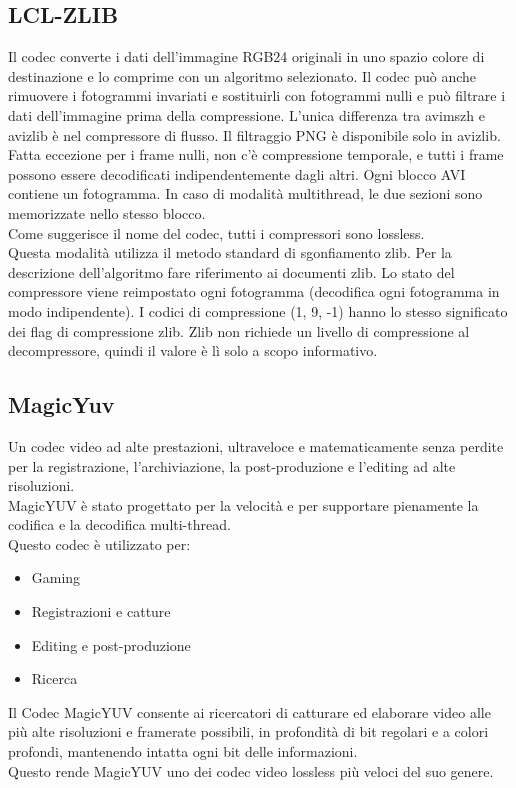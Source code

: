 \subsection{LCL-ZLIB}
Il codec converte i dati dell'immagine RGB24 originali in uno spazio colore di destinazione e lo comprime con un algoritmo selezionato. Il codec può anche rimuovere i fotogrammi invariati e sostituirli con fotogrammi nulli e può filtrare i dati dell'immagine prima della compressione. L'unica differenza tra avimszh e avizlib è nel compressore di flusso. Il filtraggio PNG è disponibile solo in avizlib. Fatta eccezione per i frame nulli, non c'è compressione temporale, e tutti i frame possono essere decodificati indipendentemente dagli altri. Ogni blocco AVI contiene un fotogramma. In caso di modalità multithread, le due sezioni sono memorizzate nello stesso blocco.
\\
Come suggerisce il nome del codec, tutti i compressori sono lossless.
\\
Questa modalità utilizza il metodo standard di sgonfiamento zlib. Per la descrizione dell'algoritmo fare riferimento ai documenti zlib. Lo stato del compressore viene reimpostato ogni fotogramma (decodifica ogni fotogramma in modo indipendente). I codici di compressione (1, 9, -1) hanno lo stesso significato dei flag di compressione zlib. Zlib non richiede un livello di compressione al decompressore, quindi il valore è lì solo a scopo informativo\cite{zlib}.

\subsection{MagicYuv}
Un codec video ad alte prestazioni, ultraveloce e matematicamente senza perdite per la registrazione, l'archiviazione, la post-produzione e l'editing ad alte risoluzioni.
\\
MagicYUV è stato progettato per la velocità e per supportare pienamente la codifica e la decodifica multi-thread.
\\
Questo codec è utilizzato per:
\begin{itemize}[noitemsep]
    \item Gaming
    \item Registrazioni e catture
    \item Editing e post-produzione
    \item Ricerca
\end{itemize}
Il Codec MagicYUV consente ai ricercatori di catturare ed elaborare video alle più alte risoluzioni e framerate possibili, in profondità di bit regolari e a colori profondi, mantenendo intatta ogni bit delle informazioni.
\\
Questo rende MagicYUV uno dei codec video lossless più veloci del suo genere\cite{magicyuv}.


